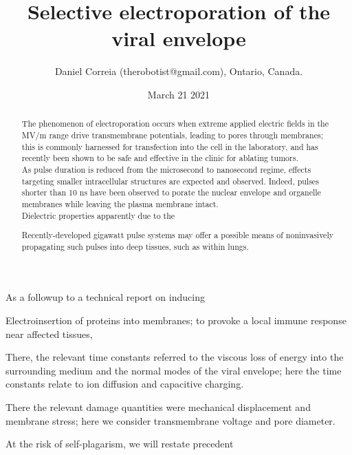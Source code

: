 \documentclass[fleqn,10pt]{article}
\begin{document}
\title{Selective electroporation of the viral envelope}
\author{\small{Daniel Correia (therobotist@gmail.com), Ontario, Canada.}}
\date{March 21 2021}

\flushbottom 
\maketitle
\thispagestyle{empty}

\renewcommand{\abstractname}{Summary}    %



\begin{abstract}
	\noindent The phenomenon of electroporation occurs when extreme applied electric fields in the MV/m range drive transmembrane potentials, leading to pores through membranes; this is commonly harnessed for transfection into the cell in the laboratory, and has recently been shown to be safe and effective in the clinic for ablating tumors.\\
	
	\noindent As pulse duration is reduced from the microsecond to nanosecond regime, effects targeting smaller intracellular structures are expected and observed. Indeed, pulses shorter than 10 ns have been observed to porate the nuclear envelope and organelle membranes while leaving the plasma membrane intact. \\
	
	Dielectric properties apparently due to the 
	
	\noindent Recently-developed gigawatt pulse systems may offer a possible means of noninvasively propagating such pulses into deep tissues, such as within lungs. 
\end{abstract}

As a followup to a technical report \cite{notes2021} on inducing 

Electroinsertion of proteins into membranes\cite{Clinical1996}; to provoke a local immune response near affected tissues, 



There, the relevant time constants referred to the viscous loss of energy into the surrounding medium and the normal modes of the viral envelope; here the time constants relate to ion diffusion and capacitive charging. 

There the relevant damage quantities were mechanical displacement and membrane stress; here we consider transmembrane voltage and pore diameter. 

At the risk of self-plagarism, we will restate precedent 
\end{document}
